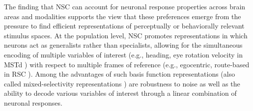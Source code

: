 

The finding that \ac{NSC} can account for neuronal response properties across
brain areas and modalities supports the view that these 
preferences emerge from the pressure to find efficient representations
of perceptually or behaviorally relevant stimulus spaces.
At the population level, \ac{NSC} promotes representations in which
neurons act as generalists rather than specialists,
allowing for the simultaneous encoding of multiple variables of interest
(e.g., heading, eye rotation velocity in \ac{MSTd} \citep{Beyeler2016})
with respect to multiple frames of reference
(e.g., egocentric, route-based in \ac{RSC} \citep{Rounds2016}).
Among the advantages of such basis function representations
\citep{Poggio1990,PougetSejnowski1997,PougetSnyder2000}
(also called mixed-selectivity representations
\citep{Eichenbaum2017,Fusi2016,Barak2013})
are robustness to noise as well as the ability to decode various variables of interest
through a linear combination of neuronal responses.

